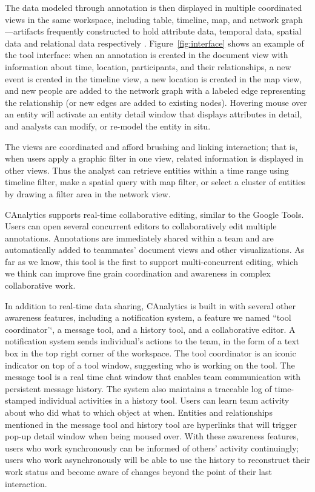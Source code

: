 The data modeled through annotation is then displayed in multiple
coordinated views in the same workspace, including table, timeline, map,
and network graph---artifacts frequently constructed to hold attribute
data, temporal data, spatial data and relational data respectively
\autocite{Carroll2013}. Figure~\ref{fig:interface} shows an example of the tool interface:
when an annotation is created in the document view with information
about time, location, participants, and their relationships, a new event
is created in the timeline view, a new location is created in the map
view, and new people are added to the network graph with a labeled edge
representing the relationship (or new edges are added to existing
nodes). Hovering mouse over an entity will activate an entity detail
window that displays attributes in detail, and analysts can modify, or
re-model the entity in situ.

The views are coordinated and afford brushing and linking interaction;
that is, when users apply a graphic filter in one view, related
information is displayed in other views. Thus the analyst can retrieve
entities within a time range using timeline filter, make a spatial query
with map filter, or select a cluster of entities by drawing a filter
area in the network view.

CAnalytics supports real-time collaborative editing, similar to the
Google Tools. Users can open several concurrent editors to
collaboratively edit multiple annotations. Annotations are immediately
shared within a team and are automatically added to teammates' document
views and other visualizations. As far as we know, this tool is the
first to support multi-concurrent editing, which we think can improve
fine grain coordination and awareness in complex collaborative work.

In addition to real-time data sharing, CAnalytics is built in with
several other awareness features, including a notification system, a
feature we named ``tool coordinator'`, a message tool, and a history
tool, and a collaborative editor. A notification system sends
individual's actions to the team, in the form of a text box in the top
right corner of the workspace. The tool coordinator is an iconic
indicator on top of a tool window, suggesting who is working on the
tool. The message tool is a real time chat window that enables team
communication with persistent message history. The system also maintains
a traceable log of time-stamped individual activities in a history tool.
Users can learn team activity about who did what to which object at
when. Entities and relationships mentioned in the message tool and
history tool are hyperlinks that will trigger pop-up detail window when
being moused over. With these awareness features, users who work
synchronously can be informed of others' activity continuingly; users
who work asynchronously will be able to use the history to reconstruct
their work status and become aware of changes beyond the point of their
last interaction.

